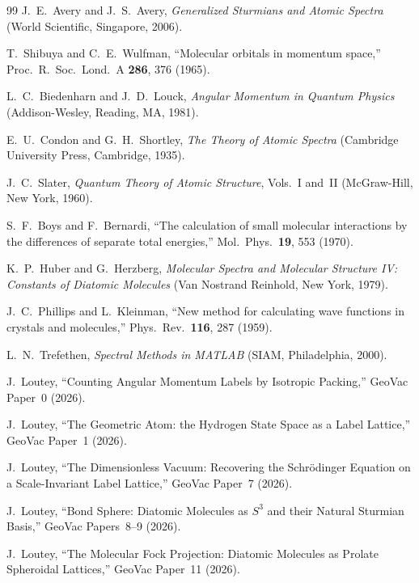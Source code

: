 \documentclass[aps,pra,twocolumn,superscriptaddress,longbibliography]{revtex4-2}
\begin{document}
\begin{thebibliography}{99}
J.~E.~Avery and J.~S.~Avery,
\textit{Generalized Sturmians and Atomic Spectra}
(World Scientific, Singapore, 2006).

T.~Shibuya and C.~E.~Wulfman,
``Molecular orbitals in momentum space,''
Proc.\ R.\ Soc.\ Lond.\ A \textbf{286}, 376 (1965).

L.~C.~Biedenharn and J.~D.~Louck,
\textit{Angular Momentum in Quantum Physics}
(Addison-Wesley, Reading, MA, 1981).

E.~U.~Condon and G.~H.~Shortley,
\textit{The Theory of Atomic Spectra}
(Cambridge University Press, Cambridge, 1935).

J.~C.~Slater,
\textit{Quantum Theory of Atomic Structure}, Vols.~I and~II
(McGraw-Hill, New York, 1960).

S.~F.~Boys and F.~Bernardi,
``The calculation of small molecular interactions by the differences of separate total energies,''
Mol.\ Phys.\ \textbf{19}, 553 (1970).

K.~P.~Huber and G.~Herzberg,
\textit{Molecular Spectra and Molecular Structure IV: Constants of Diatomic Molecules}
(Van Nostrand Reinhold, New York, 1979).

J.~C.~Phillips and L.~Kleinman,
``New method for calculating wave functions in crystals and molecules,''
Phys.\ Rev.\ \textbf{116}, 287 (1959).

L.~N.~Trefethen,
\textit{Spectral Methods in MATLAB}
(SIAM, Philadelphia, 2000).


J.~Loutey,
``Counting Angular Momentum Labels by Isotropic Packing,''
GeoVac Paper~0 (2026).

J.~Loutey,
``The Geometric Atom: the Hydrogen State Space as a Label Lattice,''
GeoVac Paper~1 (2026).

J.~Loutey,
``The Dimensionless Vacuum: Recovering the Schr\"odinger Equation on a Scale-Invariant Label Lattice,''
GeoVac Paper~7 (2026).

J.~Loutey,
``Bond Sphere: Diatomic Molecules as $S^3$ and their Natural Sturmian Basis,''
GeoVac Papers~8--9 (2026).

J.~Loutey,
``The Molecular Fock Projection: Diatomic Molecules as Prolate Spheroidal Lattices,''
GeoVac Paper~11 (2026).


\end{thebibliography}
\end{document}
